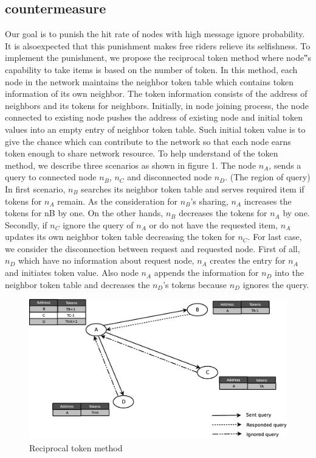 \documentclass[12pt,journal,draftcls,letterpaper,onecolumn]{IEEEtran}
\begin{document}
\subsection{countermeasure}\label{sec:countermeasure}
Our goal is to punish the hit rate of nodes with high message ignore probability. 
It is alsoexpected that this punishment makes free riders relieve its selfishness. To implement the
punishment, we propose the reciprocal token method where node‟s capability to take items is
based on the number of token. In this method, each node in the network maintains the
neighbor token table which contains token information of its own neighbor. The token
information consists of the address of neighbors and its tokens for neighbors. Initially, in
node joining process, the node connected to existing node pushes the address of existing node
and initial token values into an empty entry of neighbor token table. Such initial token value
is to give the chance which can contribute to the network so that each node earns token
enough to share network resource. To help understand of the token method, we describe three
scenarios as shown in figure 1. The node $n_A$, sends a query to connected node $n_B$, $n_C$ and
disconnected node $n_D$. (The region of query) In first scenario, $n_B$ searches its neighbor token
table and serves required item if tokens for $n_A$ remain. As the consideration for $n_B$'s sharing,
$n_A$ increases the tokens for nB by one. On the other hands, $n_B$ decreases the tokens for $n_A$ by
one. Secondly, if $n_C$ ignore the query of $n_A$ or do not have the requested item, $n_A$ updates its
own neighbor token table decreasing the token for $n_C$. For last case, we consider the
disconnection between request and requested node. First of all, $n_D$ which have no information
about request node, $n_A$ creates the entry for $n_A$ and initiates token value. Also node $n_A$
appends the information for $n_D$ into the neighbor token table and decreases the $n_D$'s tokens
because $n_D$ ignores the query.

\begin{figure}
\centering
\includegraphics[width=4.5in]{token}
\caption{Reciprocal token method} 
\label{fig:token}
\end{figure}
\end{document}
